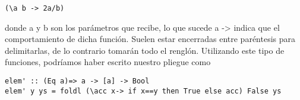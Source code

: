 \begin{lstlisting}
(\a b -> 2a/b)
\end{lstlisting}

donde a y b son los parámetros que recibe, lo que sucede a  -> indica que el comportamiento de dicha función. Suelen estar encerradas entre paréntesis para delimitarlas, de lo contrario tomarán todo el renglón.
Utilizando este tipo de funciones, podríamos haber escrito nuestro pliegue como

\begin{lstlisting}
elem' :: (Eq a)=> a -> [a] -> Bool
elem' y ys = foldl (\acc x-> if x==y then True else acc) False ys
\end{lstlisting}


